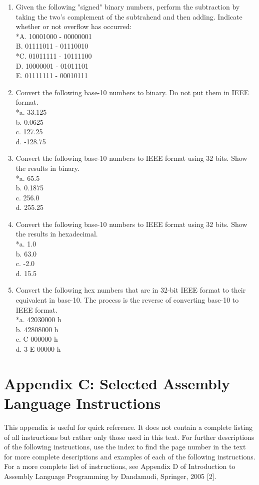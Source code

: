 \documentclass[10pt]{article}
\begin{document}
\begin{enumerate}
  \item Given the following "signed" binary numbers, perform the subtraction by taking the two's complement of the subtrahend and then adding. Indicate whether or not overflow has occurred:\\
*A. 10001000 - 00000001\\
B. 01111011 - 01110010\\
*C. 01011111 - 10111100\\
D. 10000001 - 01011101\\
E. 01111111 - 00010111
  \item Convert the following base-10 numbers to binary. Do not put them in IEEE format.\\
*a. 33.125\\
b. 0.0625\\
c. 127.25\\
d. -128.75
  \item Convert the following base-10 numbers to IEEE format using 32 bits. Show the results in binary.\\
*a. 65.5\\
b. 0.1875\\
c. 256.0\\
d. 255.25
  \item Convert the following base-10 numbers to IEEE format using 32 bits. Show the results in hexadecimal.\\
*a. 1.0\\
b. 63.0\\
c. -2.0\\
d. 15.5
  \item Convert the following hex numbers that are in 32-bit IEEE format to their equivalent in base-10. The process is the reverse of converting base-10 to IEEE format.\\
*a. 42030000 h\\
b. 42808000 h\\
c. C 000000 h\\
d. 3 E 00000 h
\end{enumerate}

\section*{Appendix C: Selected Assembly Language Instructions}
This appendix is useful for quick reference. It does not contain a complete listing of all instructions but rather only those used in this text. For further descriptions of the following instructions, use the index to find the page number in the text for more complete descriptions and examples of each of the following instructions. For a more complete list of instructions, see Appendix D of Introduction to Assembly Language Programming by Dandamudi, Springer, 2005 [2].
\end{document}
